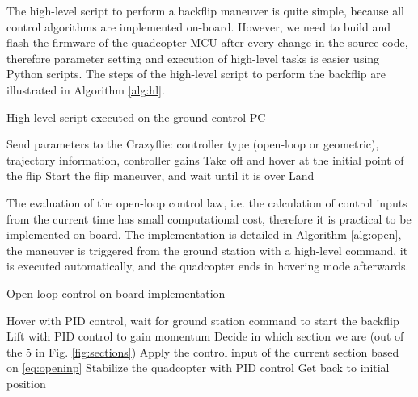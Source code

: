 The high-level script to perform a backflip maneuver is quite simple, because all control algorithms are implemented on-board. However, we need to build and flash the firmware of the quadcopter MCU after every change in the source code, therefore parameter setting and execution of high-level tasks is easier using Python scripts. The steps of the high-level script to perform the backflip are illustrated in Algorithm \ref{alg:hl}.

\begin{algorithm}
  \caption{High-level script executed on the ground control PC}
  \label{alg:hl}
  \begin{algorithmic}[1]
    \State Send parameters to the Crazyflie: controller type (open-loop or geometric), trajectory information, controller gains
    \State Take off and hover at the initial point of the flip
    \State Start the flip maneuver, and wait until it is over
    \State Land
  \end{algorithmic}
  \end{algorithm}

The evaluation of the open-loop control law, i.e. the calculation of control inputs from the current time has small computational cost, therefore it is practical to be implemented on-board. The implementation is detailed in Algorithm \ref{alg:open}, the maneuver is triggered from the ground station with a high-level command, it is executed automatically, and the quadcopter ends in hovering mode afterwards.
\begin{algorithm}
  \caption{Open-loop control on-board implementation}
  \label{alg:open}
  \begin{algorithmic}[1]
    \State Hover with PID control, wait for ground station command to start the backflip
    \State Lift with PID control to gain momentum
      \State Decide in which section we are (out of the 5 in Fig. \ref{fig:sections})
      \State Apply the control input of the current section based on \eqref{eq:openinp}
    \EndWhile
    \State Stabilize the quadcopter with PID control
    \State Get back to initial position
  \end{algorithmic}
  \end{algorithm}


